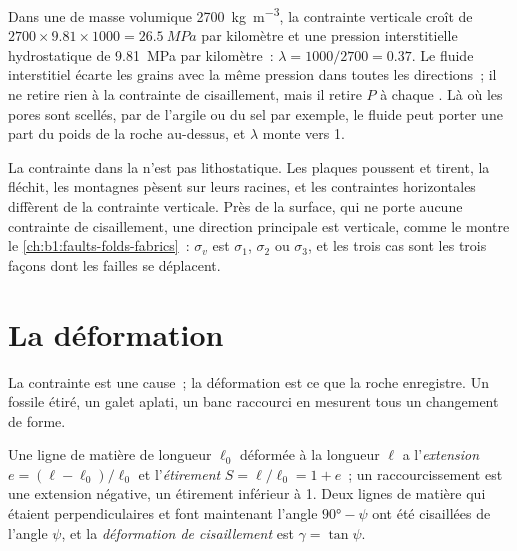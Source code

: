 Dans une  de masse volumique \qty{2700}{kg.m^{-3}}, la contrainte verticale croît de
$2700\times9.81\times1000 = \qty{26.5}{MPa}$ par kilomètre et une pression
interstitielle hydrostatique de \qty{9.81}{MPa} par kilomètre~: $\lambda = 1000/2700 = 0.37$.
Le fluide interstitiel écarte les grains avec la même pression dans toutes les
directions~; il ne retire rien à la contrainte de cisaillement, mais il retire $P$ à chaque
. Là où les pores sont scellés, par de l'argile ou du sel par exemple, le
fluide peut porter une part du poids de la roche au-dessus, et $\lambda$ monte
vers 1.

La contrainte dans la  n'est pas lithostatique. Les plaques poussent et tirent, la 
fléchit, les montagnes pèsent sur leurs racines, et les contraintes horizontales diffèrent de
la contrainte verticale. Près de la surface, qui ne porte aucune contrainte de cisaillement,
une direction principale est verticale, comme le montre le \cref{ch:b1:faults-folds-fabrics}~:
$\sigma_v$ est $\sigma_1$, $\sigma_2$ ou $\sigma_3$, et les trois cas sont
les trois façons dont les failles se déplacent.

\section{La déformation}\label{sec:b1:stress-strain-rheology:strain}

La contrainte est une cause~; la déformation est ce que la roche enregistre. Un fossile étiré, un
galet aplati, un banc raccourci en  mesurent tous un changement de forme.

\begin{definition}\label{def:b1:stress-strain-rheology:strain}
Une ligne de matière de longueur $\ell_0$ déformée à la longueur $\ell$ a
l'\emph{extension} $e = (\ell - \ell_0)/\ell_0$ et
l'\emph{étirement} $S = \ell/\ell_0 = 1 + e$~; un raccourcissement est
une extension négative, un étirement inférieur à 1. Deux lignes de matière qui étaient
perpendiculaires et font maintenant l'angle $\ang{90} - \psi$ ont été cisaillées de
l'angle $\psi$, et la \emph{déformation de cisaillement} est
$\gamma = \tan\psi$.
\end{definition}

